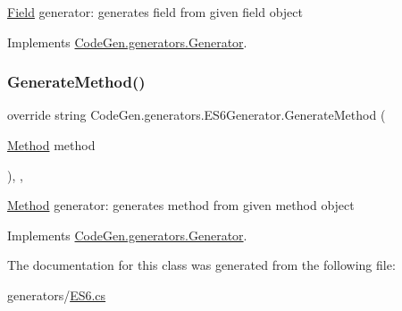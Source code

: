 \mbox{\hyperlink{classCodeGen_1_1generators_1_1Field}{Field}} generator\+: generates field from given field object  



Implements \mbox{\hyperlink{classCodeGen_1_1generators_1_1Generator_a0d1a48aedbca08c05af734a43739d1c3}{Code\+Gen.\+generators.\+Generator}}.

\mbox{\label{classCodeGen_1_1generators_1_1ES6Generator_a4107b28b436462ea13ce60b092c453f2}} 
\subsubsection{\texorpdfstring{Generate\+Method()}{GenerateMethod()}}
{\footnotesize\ttfamily override string Code\+Gen.\+generators.\+E\+S6\+Generator.\+Generate\+Method (\begin{DoxyParamCaption}\item[{\mbox{\hyperlink{classCodeGen_1_1generators_1_1Method}{Method}}}]{method }\end{DoxyParamCaption})\hspace{0.3cm}{\ttfamily [inline]}, {\ttfamily [protected]}, {\ttfamily [virtual]}}



\mbox{\hyperlink{classCodeGen_1_1generators_1_1Method}{Method}} generator\+: generates method from given method object  



Implements \mbox{\hyperlink{classCodeGen_1_1generators_1_1Generator_a04fc9bd217b3b8c3d5f7b1a3f92c79d3}{Code\+Gen.\+generators.\+Generator}}.



The documentation for this class was generated from the following file\+:\begin{DoxyCompactItemize}
\item 
generators/\mbox{\hyperlink{ES6_8cs}{E\+S6.\+cs}}\end{DoxyCompactItemize}
